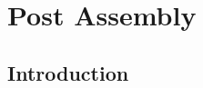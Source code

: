 \documentclass[main]{subfiles}
\begin{document}
\chapter{Post Assembly}

\section{Introduction}
\end{document}
